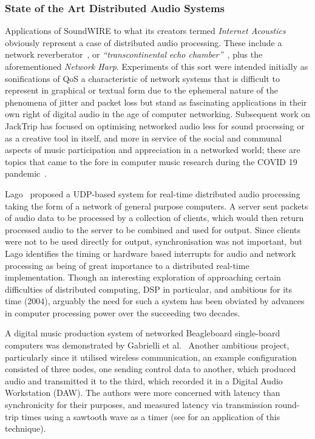 \subsubsection{State of the Art Distributed Audio Systems}

Applications of SoundWIRE to what its creators termed \textit{Internet
Acoustics}~\citep{chafe_physical_2002} obviously represent a case of distributed
audio processing.
These include a network reverberator~\citep{chafe_i_2018}, or
\textit{``transcontinental echo chamber''}~\citep{chafe_simplified_2000},
plus the aforementioned \textit{Network Harp}.
Experiments of this sort were intended initially as sonifications of QoS
\textemdash{} a characteristic of network systems that is difficult to represent
in graphical or textual form due to the ephemeral nature of the phenomena of
jitter and packet loss \textemdash{} but stand as fascinating applications in
their own right of digital audio in the age of computer networking.
Subsequent work on JackTrip has focused on optimising networked audio less
for sound processing or as a creative tool in itself, and more in service of
the social and communal aspects of music participation and appreciation in a
networked world;
these are topics that came to the fore in computer music research during the
COVID 19 pandemic~\citep{bosi_experiencing_2021,sacchetto_jacktrip-webrtc_2021}.

Lago~\citep{lago_distributed_2004} proposed a UDP-based system for real-time
distributed audio processing taking the form of a network of general purpose
computers.
A server sent packets of audio data to be processed by a collection of
clients, which would then return processed audio to the server to be combined
and used for output.
Since clients were not to be used directly for output, synchronisation was not
important, but Lago identifies the timing or hardware based interrupts for
audio and network processing as being of great importance to a distributed
real-time implementation.
Though an interesting exploration of approaching certain difficulties of
distributed computing, DSP in particular, and ambitious for its time (2004),
arguably the need for such a system has been obviated by advances in computer
processing power over the succeeding two decades.

A digital music production system of networked Beagleboard single-board
computers was demonstrated by Gabrielli et al.~\citep{gabrielli_networked_2012}
Another ambitious project, particularly since it utilised wireless
communication, an example configuration consisted of three nodes, one sending
control data to another, which produced audio and transmitted it to the third,
which recorded it in a Digital Audio Workstation (DAW).
The authors were more concerned with latency than synchronicity for their
purposes, and measured latency via transmission round-trip times using a
sawtooth wave as a timer (see  for an
application of this technique).

